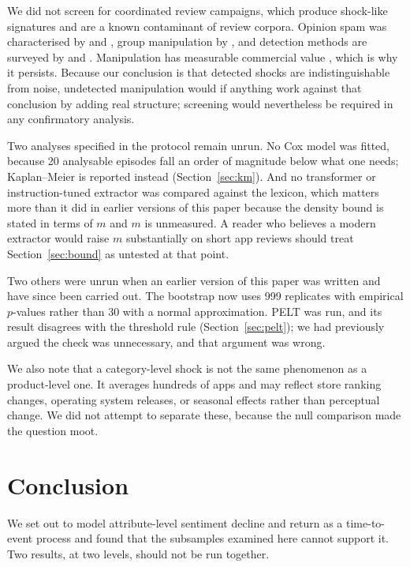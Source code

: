 \documentclass[11pt,a4paper]{article}
\makeatletter
\let\original@section\section
\renewcommand{\section}{\FloatBarrier\original@section}%
\makeatother
\begin{document}
We did not screen for coordinated review campaigns, which produce
shock-like signatures and are a known contaminant of review corpora. Opinion
spam was characterised by \citet{jindal2008} and \citet{ott2011}, group
manipulation by \citet{mukherjee2012}, and detection methods are surveyed by
\citet{mohawesh2021} and \citet{paul2021}. Manipulation has measurable
commercial value \citep{luca2011}, which is why it persists. Because our conclusion is that detected shocks are
indistinguishable from noise, undetected manipulation would if anything work
against that conclusion by adding real structure; screening would nevertheless
be required in any confirmatory analysis.

Two analyses specified in the protocol remain unrun. No Cox model was fitted,
because 20 analysable episodes fall an order of magnitude below what one needs;
Kaplan--Meier is reported instead (Section~\ref{sec:km}). And no transformer or
instruction-tuned extractor was compared against the lexicon, which matters more
than it did in earlier versions of this paper because the density bound is
stated in terms of $m$ and $m$ is unmeasured. A reader who believes a modern
extractor would raise $m$ substantially on short app reviews should treat
Section~\ref{sec:bound} as untested at that point.

Two others were unrun when an earlier version of this paper was written and have
since been carried out. The bootstrap now uses 999 replicates with empirical
$p$-values rather than 30 with a normal approximation. PELT was run, and its
result disagrees with the threshold rule (Section~\ref{sec:pelt}); we had
previously argued the check was unnecessary, and that argument was wrong.

We also note that a category-level shock is not the same phenomenon as a
product-level one. It averages hundreds of apps and may reflect store ranking
changes, operating system releases, or seasonal effects rather than perceptual
change. We did not attempt to separate these, because the null comparison made
the question moot.

\section{Conclusion}

We set out to model attribute-level sentiment decline and return as a
time-to-event process and found that the subsamples examined here cannot
support it. Two results, at two levels, should not be run together.
\end{document}
